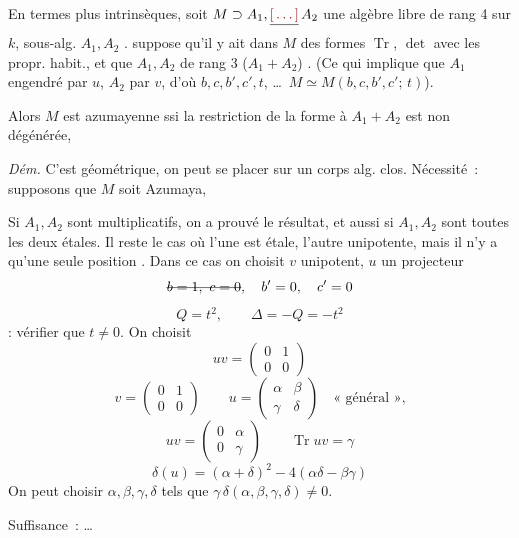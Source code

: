 \documentclass[11pt,a4paper]{article}
\begin{document}
En termes plus intrinsèques, soit  $M \supset A_1, \struck{\ill{}}\, A_2$ une algèbre  libre de rang 4 sur $k$, \struck{\ill{}}  sous-alg. $A_1, A_2$ .  suppose  qu'il y ait dans $M$ des formes $\operatorname{Tr}$, $\det$ avec les propr. habit., et que $A_1, A_2$ \ill{} \ill{}   de rang 3 ($A_1 + A_2$) \add{\ill{} \ill{}}. (Ce qui implique que $A_1$ engendré par $u$, $A_2$ par $v$, d'où $b, c, b', c', t$, \ldots\ $M \simeq M(b, c, b', c';\, t)$).

Alors $M$ est azumayenne ssi la restriction de la forme \struck{$\det$}  à $A_1 + A_2$ est non dégénérée,

\emph{Dém.} C'est géométrique, on peut se placer sur un corps alg. clos. Nécessité~: supposons que $M$ soit Azumaya,  

Si $A_1, A_2$ sont multiplicatifs, on a prouvé le résultat, et aussi si $A_1, A_2$ sont toutes les deux étales. Il reste le cas où l'une est étale, l'autre unipotente, mais il n'y a qu'une seule position . Dans ce cas on choisit $v$ unipotent, $u$ un projecteur
\[
\text{\struck{$b = 1,\ c = 0$}}, \quad b' = 0, \quad c' = 0
\]
\[
Q = t^2, \qquad \Delta = -Q = -t^2
\]
: vérifier que $t \neq 0$. On choisit
\[
uv = \begin{pmatrix} 0 & 1\\ 0 & 0 \end{pmatrix}
\]
\[
v = \begin{pmatrix} 0 & 1\\ 0 & 0 \end{pmatrix} \qquad u = \begin{pmatrix} \alpha & \beta\\ \gamma & \delta \end{pmatrix} \quad \text{« général »,}
\]
\[
uv = \begin{pmatrix} 0 & \alpha\\ 0 & \gamma \end{pmatrix} \qquad \operatorname{Tr} uv = \gamma
\]
\[
\delta(u) = (\alpha + \delta)^2 - 4(\alpha\delta - \beta\gamma)
\]
On peut choisir $\alpha, \beta, \gamma, \delta$ tels que $\gamma\,\delta(\alpha, \beta, \gamma, \delta) \neq 0$.

Suffisance~:  \ldots
{}

\end{document}
